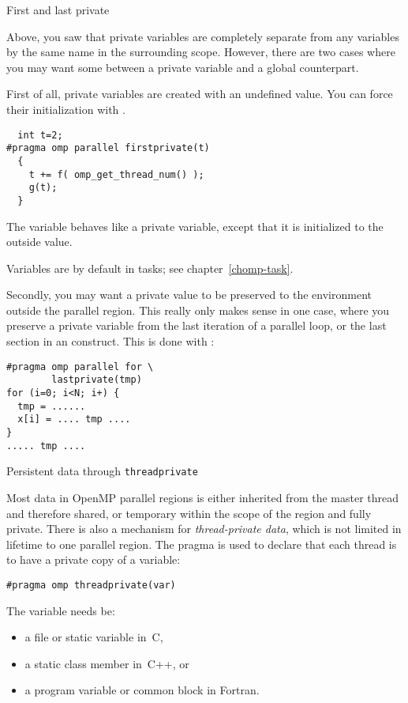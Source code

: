  {First and last private}

Above, you saw that private variables are completely separate from any
variables by the same name in the surrounding scope. However, there
are two cases where you may want some 
between a private variable and a global counterpart.

First of all, private variables are created with an undefined value.
You can force their initialization with .
\begin{lstlisting}
  int t=2;
#pragma omp parallel firstprivate(t)
  {
    t += f( omp_get_thread_num() );
    g(t);
  }
\end{lstlisting}
The variable  behaves like a private variable, except that it is
initialized to the outside value.

\begin{remark}
  Variables are  by default in tasks;
  see chapter~\ref{chomp-task}.
\end{remark}

Secondly, you may want a private value to be preserved to the
environment outside the parallel region. This really only makes sense
in one case, where you
preserve a private variable
from the last iteration of a parallel loop, or the last section in an
 construct. This is done with :
\begin{lstlisting}
#pragma omp parallel for \
        lastprivate(tmp)
for (i=0; i<N; i+) {
  tmp = ......
  x[i] = .... tmp ....
}
..... tmp ....
\end{lstlisting}

 {Persistent data through \texttt{threadprivate}}
\label{sec:threadprivate}

Most data in OpenMP parallel regions is either inherited
from the master thread and therefore shared, or temporary within the scope of the
region and fully private.
There is also a mechanism for \emph{thread-private
  data},
which is not limited in lifetime to one parallel region.
The  pragma is used to declare that each thread
is to have a private copy of a variable:
\begin{lstlisting}
#pragma omp threadprivate(var)
\end{lstlisting}
The variable needs be:
\begin{itemize}
\item a file or static variable in~C,
\item a static class member in~C++, or
\item a program variable or common block in Fortran.
\end{itemize}

